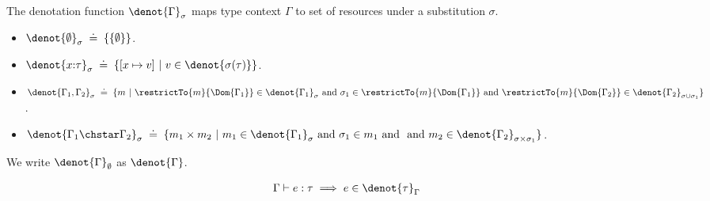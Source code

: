   \begin{definition}
    The denotation function $\denot{\Gamma}_\sigma$ maps type context $\Gamma$ to set of resources under a substitution $\sigma$.
    \begin{itemize}
    \item $\denot{\emptyset}_\sigma \;\doteq\; \{ \{\emptyset\} \}$.
    \item $\denot{x{:}\tau}_\sigma \;\doteq\; \{ [x \mapsto v] ~|~ v \in \denot{\sigma(\tau)} \}$.
    \item $\denot{\Gamma_1, \Gamma_2}_\sigma \;\doteq\; \{ m ~|~ \restrictTo{m}{\Dom{\Gamma_1}} \in \denot{\Gamma_1}_\sigma \text{ and } \sigma_1 \in \restrictTo{m}{\Dom{\Gamma_1}} \text{ and } \restrictTo{m}{\Dom{\Gamma_2}} \in \denot{\Gamma_2}_{\sigma \cup \sigma_1} \} $.
    \item $\denot{\Gamma_1 \chstar \Gamma_2}_\sigma \;\doteq\;  \{ m_1 \times m_2 ~|~ m_1 \in \denot{\Gamma_1}_\sigma \text{ and } \sigma_1 \in m_1 \text{ and }  \text{ and } m_2 \in \denot{\Gamma_2}_{\sigma \times \sigma_1} \} $.
    \end{itemize}
    We write $\denot{\Gamma}_\emptyset$ as $\denot{\Gamma}$.
  \end{definition}

\begin{definition}
\begin{align*}
  \Gamma \vdash e : \tau \implies e \in \denot{\tau}_\Gamma
\end{align*}
\end{definition}

